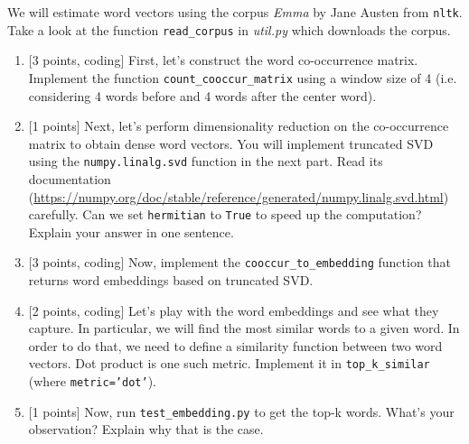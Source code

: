 \documentclass{article}
\theoremstyle{case}
\theoremstyle{definition}
\begin{document}
We will estimate word vectors using the corpus \textit{Emma} by Jane Austen from \texttt{nltk}. 
Take a look at the function \texttt{read\_corpus} in \textit{util.py} which downloads the corpus.

\begin{enumerate}
    \newpage
    \item {[3 points, coding]} First, let's construct the word co-occurrence matrix. Implement the function \texttt{count\_cooccur\_matrix} using a window size of 4 (i.e. considering 4 words before and 4 words after the center word).
        \begin{shaded}
            
        \end{shaded}

    \newpage
    \item {[1 points]} Next, let's perform dimensionality reduction on the co-occurrence matrix to obtain dense word vectors. You will implement truncated SVD using the \texttt{numpy.linalg.svd} function in the next part. Read its documentation (\url{https://numpy.org/doc/stable/reference/generated/numpy.linalg.svd.html}) carefully. Can we set \texttt{hermitian} to \texttt{True} to speed up the computation? Explain your answer in one sentence.

        \begin{shaded}
            
        \end{shaded}

    \newpage
    \item {[3 points, coding]} Now, implement the \texttt{cooccur\_to\_embedding} function that returns word embeddings based on truncated SVD.
        \begin{shaded}
            
        \end{shaded}

    \newpage
    \item {[2 points, coding]} Let's play with the word embeddings and see what they capture. In particular, we will find the most similar words to a given word. In order to do that, we need to define a similarity function between two word vectors. Dot product is one such metric. Implement it in \texttt{top\_k\_similar} (where \texttt{metric='dot'}).
        \begin{shaded}
            
        \end{shaded}

    \newpage
    \item {[1 points]} Now, run \texttt{test\_embedding.py} to get the top-k words. What's your observation? Explain why that is the case.
        \begin{shaded}
        \end{shaded}


\end{enumerate}
\end{document}
